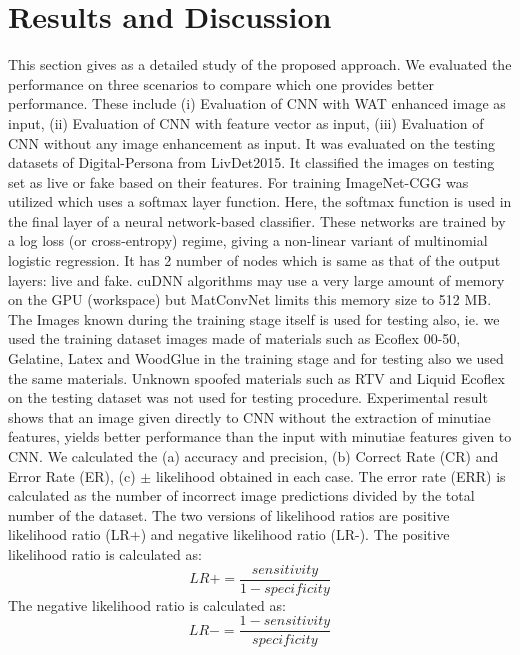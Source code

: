 \chapter{Results and Discussion}
This section gives as a detailed study of the proposed approach. We evaluated the performance on three scenarios to compare which one provides better performance. These include (i) Evaluation of CNN with WAT enhanced image as input, (ii) Evaluation of CNN with feature vector as input, (iii) Evaluation of CNN without any image enhancement as input. It was evaluated on the testing datasets of Digital-Persona from LivDet2015. It classified the images on testing set as live or fake based on their features. For training ImageNet-CGG was utilized which uses a softmax layer function. Here, the softmax function is used in the final layer of a neural network-based classifier. These networks are trained by a log loss (or cross-entropy) regime, giving a non-linear variant of multinomial logistic regression. It has 2 number of nodes which is same as that of the output layers: live and fake. cuDNN algorithms may use a very large amount of memory on the GPU (workspace) but MatConvNet limits this memory size to 512 MB. The Images known during the training stage itself is used for testing also, ie. we used the training dataset images made of materials such as Ecoflex 00-50, Gelatine, Latex and WoodGlue in the training stage and for testing also we used the same materials. Unknown spoofed materials such as RTV and Liquid Ecoflex on the testing dataset was not used for testing procedure. Experimental result shows that an image given directly to CNN without the extraction of minutiae features, yields better performance than the input with minutiae features given to CNN. We calculated the (a) accuracy and precision,  (b) Correct Rate (CR) and Error Rate (ER), (c)  $\pm$ likelihood obtained in each case. The error rate (ERR) is calculated as the number of incorrect image predictions divided by the total number of the dataset. The two versions of likelihood ratios are positive likelihood ratio (LR+) and negative likelihood ratio (LR-). The positive likelihood ratio is calculated as:
\begin{equation}
     LR+ = \frac{sensitivity}{1-specificity} 
\end{equation}
The negative likelihood ratio is calculated as:
\begin{equation}
	LR- = \frac{1-sensitivity}{specificity} 
\end{equation}

